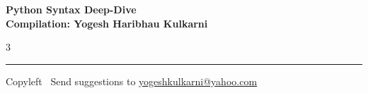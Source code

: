 \documentclass[8pt,landscape]{article}
\begin{document}
\footnotesize


\begin{center}
\Large{\textbf{Python Syntax Deep-Dive\\ Compilation: Yogesh Haribhau Kulkarni}}
\end{center}

\begin{multicols}{3}

\end{multicols}

\rule{\linewidth}{0.25pt}
\scriptsize
Copyleft \textcopyleft\  Send suggestions to
\href{http://www.yogeshkulkarni.com}{yogeshkulkarni@yahoo.com}
\end{document}
